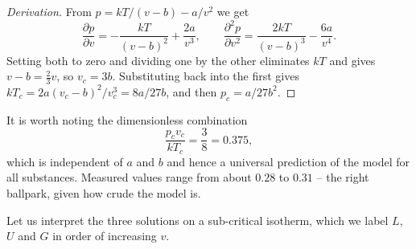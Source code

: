 \begin{proof}[Derivation]
	From $p = kT/(v-b) - a/v^2$ we get
	$$
	\frac{\partial p}{\partial v} = -\frac{kT}{(v-b)^2}+\frac{2a}{v^3}, \qquad \frac{\partial^2 p}{\partial v^2} = \frac{2kT}{(v-b)^3}-\frac{6a}{v^4}.
	$$
	Setting both to zero and dividing one by the other eliminates $kT$ and gives $v - b = \tfrac 23 v$, so $v_c = 3b$. Substituting back into the first gives $kT_c = 2a(v_c-b)^2/v_c^3 = 8a/27b$, and then $p_c = a/27b^2$.
\end{proof}

It is worth noting the dimensionless combination
$$
\frac{p_c v_c}{kT_c} = \frac{3}{8} = 0.375,
$$
which is independent of $a$ and $b$ and hence a universal prediction of the model for all substances. Measured values range from about $0.28$ to $0.31$ -- the right ballpark, given how crude the model is.

Let us interpret the three solutions on a sub-critical isotherm, which we label $L$, $U$ and $G$ in order of increasing $v$.

